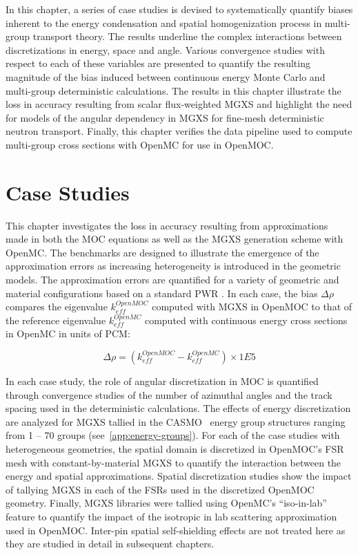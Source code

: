 In this chapter, a series of case studies is devised to systematically quantify biases inherent to the energy condensation and spatial homogenization process in multi-group transport theory. The results underline the complex interactions between discretizations in energy, space and angle. Various convergence studies with respect to each of these variables are presented to quantify the resulting magnitude of the bias induced between continuous energy Monte Carlo and multi-group deterministic calculations. The results in this chapter illustrate the loss in accuracy resulting from scalar flux-weighted \ac{MGXS} and highlight the need for models of the angular dependency in \ac{MGXS} for fine-mesh deterministic neutron transport. Finally, this chapter verifies the data pipeline used to compute multi-group cross sections with OpenMC for use in OpenMOC.


\section{Case Studies}
\label{sec:chap4-case-studies}

This chapter investigates the loss in accuracy resulting from approximations made in both the \ac{MOC} equations as well as the \ac{MGXS} generation scheme with OpenMC. The benchmarks are designed to illustrate the emergence of the approximation errors as increasing heterogeneity is introduced in the geometric models. The approximation errors are quantified for a variety of geometric and material configurations based on a standard \ac{PWR} . In each case, the bias $\Delta\rho$ compares the eigenvalue $k_{eff}^{OpenMOC}$ computed with \ac{MGXS} in OpenMOC to that of the reference eigenvalue $k_{eff}^{OpenMC}$ computed with continuous energy cross sections in OpenMC in units of \ac{PCM}:

\begin{equation}
\label{eqn:chap4-delta-rho}
\Delta\rho = \left(k_{eff}^{OpenMOC} - k_{eff}^{OpenMC}\right) \times 1E5
\end{equation}

In each case study, the role of angular discretization in \ac{MOC} is quantified through convergence studies of the number of azimuthal angles and the track spacing used in the deterministic calculations. The effects of energy discretization are analyzed for \ac{MGXS} tallied in the CASMO~\cite{rhodes2006casmo} energy group structures ranging from 1 -- 70 groups (see~\ref{app:energy-groups}). For each of the case studies with heterogeneous geometries, the spatial domain is discretized in OpenMOC's \ac{FSR} mesh with constant-by-material \ac{MGXS} to quantify the interaction between the energy and spatial approximations. Spatial discretization studies show the impact of tallying \ac{MGXS} in each of the \ac{FSR}s used in the discretized OpenMOC geometry. Finally, \ac{MGXS} libraries were tallied using OpenMC's ``iso-in-lab'' feature to quantify the impact of the isotropic in lab scattering approximation used in OpenMOC. Inter-pin spatial self-shielding effects are not treated here as they are studied in detail in subsequent chapters.

